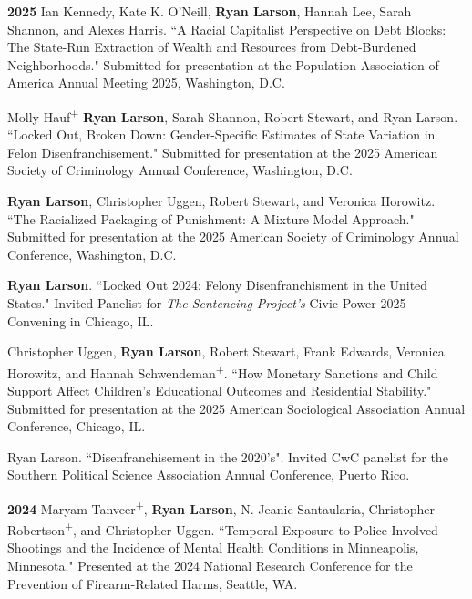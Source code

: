 \documentclass[letterpaper]{article}
\newenvironment{publist}{%
  \begin{list}{}{%
    \setlength{\leftmargin}{0cm}   %
    \setlength{\labelwidth}{2cm}     %
    \setlength{\labelsep}{0.5cm}     %
  }%
}{%
  \end{list}%
}
\begin{document}
\begin{publist}

\item [\textbf{2025}] Ian Kennedy, Kate K. O'Neill, \textbf{Ryan Larson}, Hannah Lee, Sarah Shannon, and Alexes Harris. ``A Racial Capitalist Perspective on Debt Blocks: The State-Run Extraction of Wealth and Resources from Debt-Burdened Neighborhoods." Submitted for presentation at the Population Association of America Annual Meeting 2025, Washington, D.C. 

\item Molly Hauf\textsuperscript{+} \textbf{Ryan Larson}, Sarah Shannon, Robert Stewart, and Ryan Larson. ``Locked Out, Broken Down: Gender-Specific Estimates of State Variation in Felon Disenfranchisement." Submitted for presentation at the 2025 American Society of Criminology Annual Conference, Washington, D.C. 

\item \textbf{Ryan Larson}, Christopher Uggen, Robert Stewart, and Veronica Horowitz. ``The Racialized Packaging of Punishment: A Mixture Model Approach." Submitted for presentation at the 2025 American Society of Criminology Annual Conference, Washington, D.C. 

\item \textbf{Ryan Larson}. ``Locked Out 2024: Felony Disenfranchisment in the United States." Invited Panelist for \textit{The Sentencing Project's} Civic Power 2025 Convening in Chicago, IL. 

\item Christopher Uggen, \textbf{Ryan Larson}, Robert Stewart, Frank Edwards, Veronica Horowitz, and Hannah Schwendeman\textsuperscript{+}. ``How Monetary Sanctions and Child Support Affect Children's Educational Outcomes and Residential Stability." Submitted for presentation at the 2025 American Sociological Association Annual Conference, Chicago, IL. 

\item Ryan Larson. ``Disenfranchisement in the 2020's". Invited CwC panelist for the Southern Political Science Association Annual Conference, Puerto Rico. 

\item[\textbf{2024}] Maryam Tanveer\textsuperscript{+}, \textbf{Ryan Larson}, N. Jeanie Santaularia, Christopher Robertson\textsuperscript{+}, and Christopher Uggen. ``Temporal Exposure to Police-Involved Shootings and the Incidence of Mental Health Conditions in Minneapolis, Minnesota." Presented at the 2024 National Research Conference for the Prevention of Firearm-Related Harms, Seattle, WA. 


\end{publist}
\end{document}
